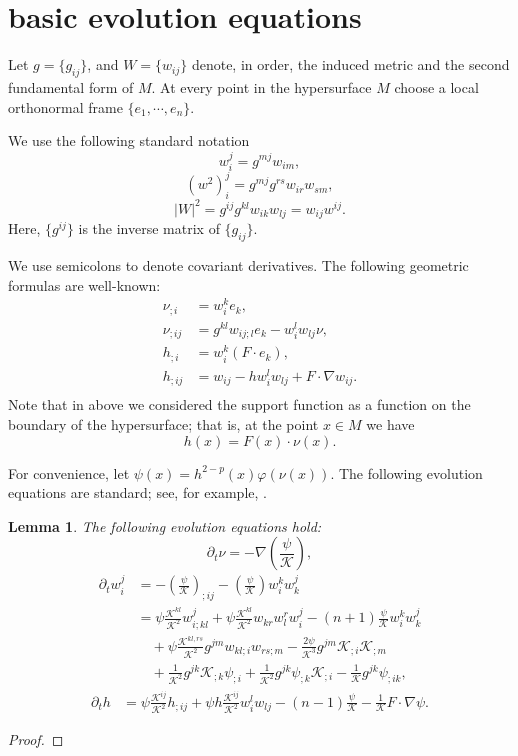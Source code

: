 \documentclass{amsart}
\newtheorem{lemma}[theorem]{Lemma}
\theoremstyle{definition}
\theoremstyle{remark}
\numberwithin{equation}{section}
\begin{document}
\section{basic evolution equations}

Let $g=\{g_{ij}\}$, and $W=\{w_{ij}\}$ denote, in order, the induced metric and the second fundamental form of $M$. At every point in the hypersurface $M$ choose a local orthonormal frame $\{e_1,\cdots, e_n\}.$

We use the following standard notation
\[w_i^j=g^{mj}w_{im},\]
\[(w^2)_i^j=g^{mj}g^{rs}w_{ir}w_{sm},\]
\[|W|^2=g^{ij}g^{kl}w_{ik}w_{lj}=w_{ij}w^{ij}.\]
Here, $\{g^{ij}\}$ is the inverse matrix of $\{g_{ij}\}.$


We use semicolons to denote covariant derivatives. The following geometric formulas are well-known:
\begin{align*}
\nu_{;i} &= w_i^ke_k,\\
\nu_{;ij} &= g^{kl}w_{ij;l}e_k - w_i^lw_{lj}\nu,\\
h_{;i} &= w_i^k (F\cdot e_k),\\
h_{;ij} &= w_{ij} - hw_i^lw_{lj} + F \cdot \nabla w_{ij}.\\
\end{align*}
Note that in above we considered the support function as a function on the boundary of the hypersurface; that is, at the point $x\in M$ we have
$$h(x)=F(x)\cdot \nu(x).$$


For convenience, let $\psi(x)=h^{2-p}(x)\varphi(\nu(x))$. The following evolution equations are standard; see, for example, \cite{Gerhardt:/2006}.
\begin{lemma} The following evolution equations hold:
\[\partial_t \nu = -\nabla \left(\frac{\psi}{\mathcal{K}}\right),\]
\begin{align*}
\partial_t w_i^j &= -\left(\frac{\psi}{\mathcal{K}}\right)_{;ij} - \left(\frac{\psi}{\mathcal{K}}\right) w_i^kw_k^j \\
&= \psi \frac{\mathcal{K}^{kl}}{\mathcal{K}^2} w_{i;kl}^j + \psi \frac{\mathcal{K}^{kl}}{\mathcal{K}^2} w_{kr}w_l^rw_i^j -(n+1)\frac{\psi }{\mathcal{K}} w_{i}^k w_k^{j} \\
&\quad  + \psi\frac{\mathcal{K}^{kl,rs}}{\mathcal{K}^{2}}g^{jm} w_{kl;i}w_{rs;m}- \frac{2\psi}{\mathcal{K}^{3}}g^{jm} \mathcal{K}_{;i}\mathcal{K}_{;m} \\
&\quad + \frac{1}{\mathcal{K}^{2}}g^{jk}\mathcal{K}_{;k}\psi_{;i} + \frac{1}{\mathcal{K}^{2}} g^{jk}\psi_{;k}\mathcal{K}_{;i} - \frac{1}{\mathcal{K}} g^{jk}\psi_{;ik},
\end{align*}
\begin{align*}
\partial_th &= \psi \frac{\mathcal{K}^{ij}}{\mathcal{K}^{2}} h_{;ij} + \psi h \frac{\mathcal{K}^{ij}}{\mathcal{K}^{2}} w_i^lw_{lj} - (n-1) \frac{\psi}{\mathcal{K}}- \frac{1}{\mathcal{K}} F\cdot\nabla\psi.
\end{align*}
\end{lemma}
\begin{proof}
\end{proof}
\end{document}

